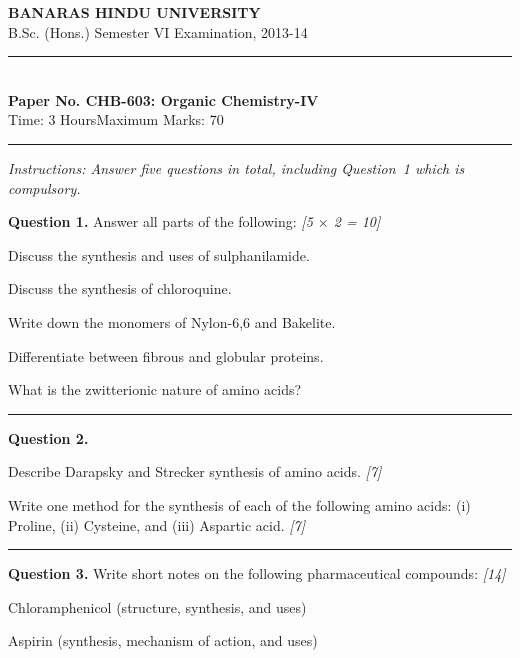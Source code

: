 \documentclass[11pt,a4paper]{article}
\newcommand{\pts}[1]{\hfill   \textit{[#1]}}
\begin{document}
\begin{center}
  {\large\bfseries BANARAS HINDU UNIVERSITY}\\[2pt]
  {\normalsize B.Sc. (Hons.) Semester VI Examination, 2013-14}\\[6pt]
  \rule{0.8\linewidth}{0.5pt}\\[6pt]
  {\large\bfseries Paper No. CHB-603: Organic Chemistry-IV}\\[4pt]
  {\normalsize Time: 3 Hours\hfill Maximum Marks: 70}
\end{center}
\rule{\linewidth}{0.4pt}
\small



\noindent   \textit{Instructions: Answer five questions in total, including Question~1 which is compulsory.}

\normalsize
\bigskip




\noindent   \textbf{Question 1.} Answer all parts of the following: \pts{5 $ \times$ 2 = 10}

\begin{parts}
  \item Discuss the synthesis and uses of sulphanilamide.
  \item Discuss the synthesis of chloroquine.
  \item Write down the monomers of Nylon-6,6 and Bakelite.
  \item Differentiate between fibrous and globular proteins.
  \item What is the zwitterionic nature of amino acids?
\end{parts}

\medskip\rule{\linewidth}{0.2pt}




\noindent   \textbf{Question 2.}

\begin{parts}
  \item Describe Darapsky and Strecker synthesis of amino acids. \pts{7}
  \item Write one method for the synthesis of each of the following amino acids: (i) Proline, (ii) Cysteine, and (iii) Aspartic acid. \pts{7}
\end{parts}

\medskip\rule{\linewidth}{0.2pt}




\noindent   \textbf{Question 3.} Write short notes on the following pharmaceutical compounds: \pts{14}

\begin{parts}
  \item Chloramphenicol (structure, synthesis, and uses)
  \item Aspirin (synthesis, mechanism of action, and uses)
\end{parts}
\end{document}
